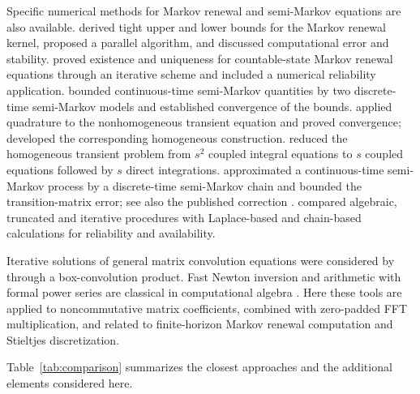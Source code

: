 \documentclass[3p,12pt,authoryear]{elsarticle}
\theoremstyle{definition}
\theoremstyle{remark}
\begin{document}
Specific numerical methods for Markov renewal and semi-Markov equations are also available. \citet{ElkinsWortman2001} derived tight upper and lower bounds for the Markov renewal kernel, proposed a parallel algorithm, and discussed computational error and stability. \citet{HouLimniosSchon2017} proved existence and uniqueness for countable-state Markov renewal equations through an iterative scheme and included a numerical reliability application. \citet{Mercier2008} bounded continuous-time semi-Markov quantities by two discrete-time semi-Markov models and established convergence of the bounds. \citet{JanssenManca2001} applied quadrature to the nonhomogeneous transient equation and proved convergence; \citet{CorradiJanssenManca2004} developed the corresponding homogeneous construction. \citet{MouraDroguett2010} reduced the homogeneous transient problem from $s^2$ coupled integral equations to $s$ coupled equations followed by $s$ direct integrations. \citet{WuMayaLimnios2021} approximated a continuous-time semi-Markov
process by a discrete-time semi-Markov chain and bounded the
transition-matrix error; see also the published correction
\citep{WuMayaLimnios2021Correction}. \citet{WuLimnios2024} compared algebraic, truncated and iterative procedures with Laplace-based and chain-based calculations for reliability and availability.

Iterative solutions of general matrix convolution equations were considered by \citet{KilicmanAlZhour2010} through a box-convolution product. Fast Newton inversion and arithmetic with formal power series are classical in computational algebra \citep{BrentKung1978,VonZurGathenGerhard2003}. Here these tools are applied to noncommutative matrix coefficients, combined with zero-padded FFT multiplication, and related to finite-horizon Markov renewal computation and Stieltjes discretization.

Table~\ref{tab:comparison} summarizes the closest approaches and the additional elements considered here.
\end{document}
